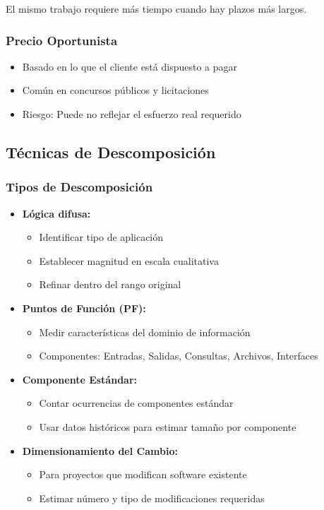 El mismo trabajo requiere más tiempo cuando hay plazos más largos.

\subsubsection{Precio Oportunista}

\begin{itemize}
    \item Basado en lo que el cliente está dispuesto a pagar
    \item Común en concursos públicos y licitaciones
    \item Riesgo: Puede no reflejar el esfuerzo real requerido
\end{itemize}

\subsection{Técnicas de Descomposición}\label{subsec:tecnicas-de-descomposicion}

\subsubsection{Tipos de Descomposición}

\begin{itemize}
    \item \textbf{Lógica difusa:}
    \begin{itemize}
        \item Identificar tipo de aplicación
        \item Establecer magnitud en escala cualitativa
        \item Refinar dentro del rango original
    \end{itemize}

    \item \textbf{Puntos de Función (PF):}
    \begin{itemize}
        \item Medir características del dominio de información
        \item Componentes: Entradas, Salidas, Consultas, Archivos, Interfaces
    \end{itemize}

    \item \textbf{Componente Estándar:}
    \begin{itemize}
        \item Contar ocurrencias de componentes estándar
        \item Usar datos históricos para estimar tamaño por componente
    \end{itemize}

    \item \textbf{Dimensionamiento del Cambio:}
    \begin{itemize}
        \item Para proyectos que modifican software existente
        \item Estimar número y tipo de modificaciones requeridas
    \end{itemize}
\end{itemize}

